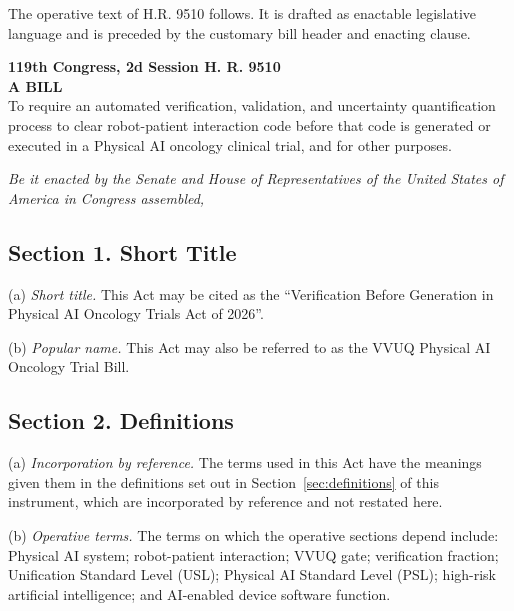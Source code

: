
The operative text of H.R. 9510 follows. It is drafted as enactable legislative
language and is preceded by the customary bill header and enacting clause.



\begin{flushleft}
\textbf{119th Congress, 2d Session \quad H. R. 9510}\\[3pt]
\textbf{A BILL}\\[2pt]
To require an automated verification, validation, and uncertainty quantification
process to clear robot-patient interaction code before that code is generated or
executed in a Physical AI oncology clinical trial, and for other purposes.
\end{flushleft}

\clearpage

\textit{Be it enacted by the Senate and House of Representatives of the United
States of America in Congress assembled,}

\subsection{Section 1. Short Title}

(a) \textit{Short title.} This Act may be cited as the ``Verification Before
Generation in Physical AI Oncology Trials Act of 2026''.

(b) \textit{Popular name.} This Act may also be referred to as the VVUQ Physical
AI Oncology Trial Bill.

\subsection{Section 2. Definitions}

(a) \textit{Incorporation by reference.} The terms used in this Act have the
meanings given them in the definitions set out in
Section~\ref{sec:definitions} of this instrument, which are incorporated by
reference and not restated here.

(b) \textit{Operative terms.} The terms on which the operative sections depend
include: Physical AI system; robot-patient interaction; VVUQ gate; verification
fraction; Unification Standard Level (USL); Physical AI Standard Level (PSL);
high-risk artificial intelligence; and AI-enabled device software function.

